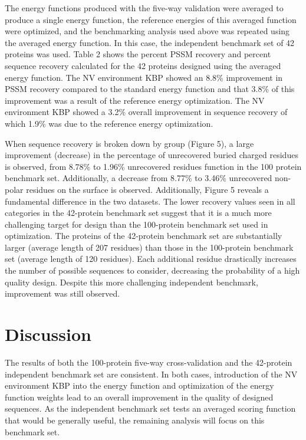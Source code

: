 The energy functions produced with the five-way validation were averaged to produce a single energy function, the reference energies of this averaged function were optimized, and the benchmarking analysis used above was repeated using the averaged energy function.
In this case, the independent benchmark set of 42 proteins was used.
Table 2 shows the percent PSSM recovery and percent sequence recovery calculated for the 42 proteins designed using the averaged energy function.
The NV environment KBP showed an 8.8\% improvement in PSSM recovery compared to the standard energy function and that 3.8\% of this improvement was a result of the reference energy optimization.
The NV environment KBP showed a 3.2\% overall improvement in sequence recovery of which 1.9\% was due to the reference energy optimization. 

When sequence recovery is broken down by group (Figure 5), a large improvement (decrease) in the percentage of unrecovered buried charged residues is observed, from 8.78\% to 1.96\% unrecovered residues function in the 100 protein benchmark set.
Additionally, a decrease from 8.77\% to 3.46\% unrecovered non-polar residues on the surface is observed.
Additionally, Figure 5 reveals a fundamental difference in the two datasets.
The lower recovery values seen in all categories in the 42-protein benchmark set suggest that it is a much more challenging target for design than the 100-protein benchmark set used in optimization.
The proteins of the 42-protein benchmark set are substantially larger (average length of 207 residues) than those in the 100-protein benchmark set (average length of 120 residues).
Each additional residue drastically increases the number of possible sequences to consider, decreasing the probability of a high quality design.
Despite this more challenging independent benchmark, improvement was still observed. 

\section{Discussion}

The results of both the 100-protein five-way cross-validation and the 42-protein independent benchmark set are consistent.
In both cases, introduction of the NV environment KBP into the energy function and optimization of the energy function weights lead to an overall improvement in the quality of designed sequences.
As the independent benchmark set tests an averaged scoring function that would be generally useful, the remaining analysis will focus on this benchmark set. 

